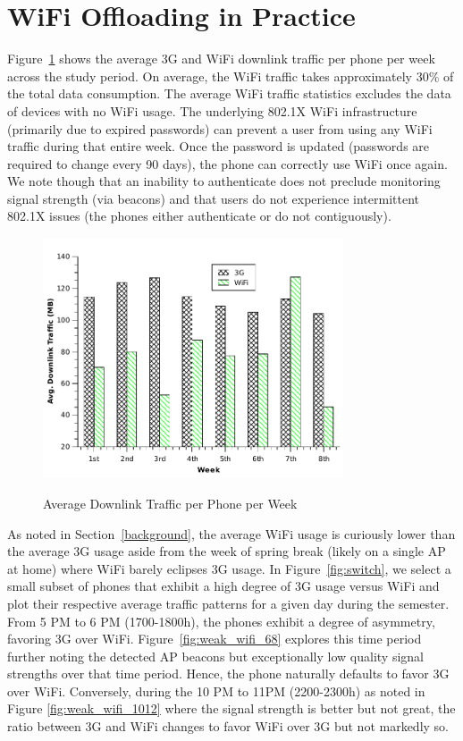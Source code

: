 \section{WiFi Offloading in Practice}
Figure~\ref{fig:avg_downlink} shows the average 3G and WiFi downlink traffic per phone per week across the study period. On average, the WiFi traffic takes approximately 30\% of the total data consumption. The average WiFi traffic statistics excludes the data of devices with no WiFi usage. The underlying 802.1X WiFi infrastructure (primarily due to expired passwords) can prevent a user from using any WiFi traffic during that entire week. Once the password is updated (passwords are required to change every 90 days), the phone can correctly use WiFi once again. We note though that an inability to authenticate does not preclude monitoring signal strength (via beacons) and that users do not experience intermittent 802.1X issues (the phones either authenticate or do not contiguously).   

\begin{figure}[h!tbp]
\centering
{\includegraphics[width = 3.5in]{graphs/avg_downlink2.pdf}}
\caption{Average Downlink Traffic per Phone per Week} 
\label{fig:avg_downlink}
\end{figure}

As noted in Section~\ref{background}, the average WiFi usage is curiously lower than the average 3G usage aside from the week of spring break (likely on a single AP at home) where WiFi barely eclipses 3G usage. In Figure~\ref{fig:switch}, we select a small subset of phones that exhibit a high degree of 3G usage versus WiFi and plot their respective average traffic patterns for a given day during the semester. From 5 PM to 6 PM (1700-1800h), the phones exhibit a degree of asymmetry, favoring 3G over WiFi.  Figure~\ref{fig:weak_wifi_68} explores this time period further noting the detected AP beacons but exceptionally low quality signal strengths over that time period. Hence, the phone naturally defaults to favor 3G over WiFi.  Conversely, during the 10 PM to 11PM (2200-2300h) as noted in Figure \ref{fig:weak_wifi_1012} where the signal strength is better but not great, the ratio between 3G and WiFi changes to favor WiFi over 3G but not markedly so.   

